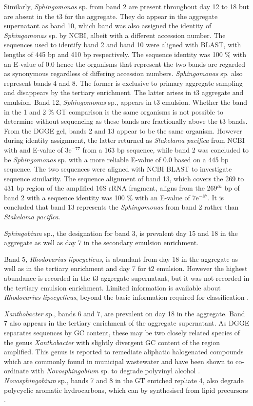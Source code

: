 \documentclass[11pt]{article}
\begin{document}
Similarly, \emph{Sphingomonas} sp. from band 2 are present throughout day 12 to 18 but are absent in the t3 for the aggregate. They do appear in the aggregate supernatant as band 10, which band was also assigned the identity of \emph{Sphingomonas} sp. by NCBI, albeit with a different accession number. The sequences used to identify band 2 and band 10 were aligned with BLAST, with lengths of 445 bp and 410 bp respectively. The sequence identity was 100 \% with an E-value of 0.0 hence the organisms that represent the two bands are regarded as synonymous regardless of differing accession numbers.
\emph{Sphingomonas} sp. also represent bands 4 and 8. The former is exclusive to primary aggregate sampling and disappears by the tertiary enrichment. The latter arises in t3 aggregate and emulsion.
Band 12, \emph{Sphingomonas} sp., appears in t3 emulsion. Whether the band in the 1 and 2 \% GT comparison is the same organisms is not possible to determine without sequencing as these bands are fractionally above the t3 bands.
From the DGGE gel, bands 2 and 13 appear to be the same organism. However during identity assignment, the latter returned as \emph{Stakelama pacifica} from NCBI with and E-value of 3e$^{-77}$ from a 163 bp sequence, while band 2 was concluded to be \emph{Sphingomonas} sp. with a more reliable E-value of 0.0 based on a 445 bp sequence. The two sequences were aligned with NCBI BLAST to investigate sequence similarity. The sequence alignment of band 13, which covers the 269 to 431 bp region of the amplified 16S rRNA fragment, aligns from the 269$^{th}$ bp of band 2 with a sequence identity was 100 \% with an E-value of 7e$^{-87}$. It is concluded that band 13 represents the \emph{Sphingomonas} from band 2 rather than \emph{Stakelama pacifica}.

\emph{Sphingobium} sp., the designation for band 3, is prevalent day 15 and 18 in the aggregate as well as day 7 in the secondary emulsion enrichment.


Band 5, \emph{Rhodovarius lipocyclicus}, is abundant from day 18 in the aggregate as well as in the tertiary enrichment and day 7 for t2 emulsion. However the highest abundance is recorded in the t3 aggregate supernatant, but it was not recorded in the tertiary emulsion enrichment. Limited information is available about \emph{Rhodovarius lipocyclicus}, beyond the basic information required for classification \cite{kampfer2004rhodovarius}.


\emph{Xanthobacter} sp., bands 6 and 7, are prevalent on day 18 in the aggregate. Band 7 also appears in the tertiary enrichment of the aggregate supernatant. As DGGE separates sequences by GC content, these may be two closely related species of the genus \emph{Xanthobacter} with slightly divergent GC content of the region amplified. This genus is reported to remediate aliphatic halogenated compounds which are commonly found in municipal wastewater \cite{janssen1985degradation} and have been shown to co-ordinate with \emph{Novosphingobium} sp. to degrade polyvinyl alcohol \cite{rong2009symbiotic}. \emph{Novosphingobium} sp., bands 7 and 8 in the GT enriched repliate 4, also degrade polycyclic aromatic hydrocarbons, which can by synthesised from lipid precursors \cite{addison2007novosphingobium}.
\end{document}
